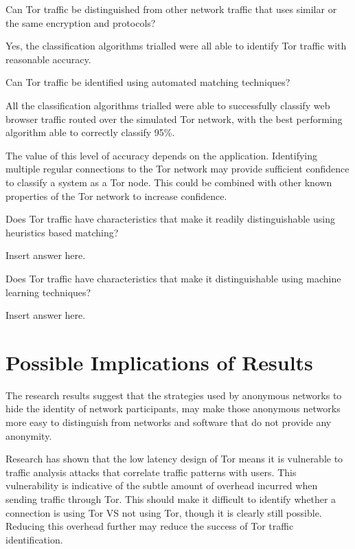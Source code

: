 \begin{enumerate*}
  \item{Can Tor traffic be distinguished from other network traffic that uses
    similar or the same encryption and protocols?}

  Yes, the classification algorithms trialled were all able to identify Tor traffic
  with reasonable accuracy.

  \item{Can Tor traffic be identified using automated matching techniques?}

  All the classification algorithms trialled were able to successfully classify
  web browser traffic routed over the simulated Tor network, with the best
  performing algorithm able to correctly classify 95\%.

  The value of this level of accuracy depends on the application. Identifying
  multiple regular connections to the Tor network may provide sufficient
  confidence to classify a system as a Tor node. This could be combined with
  other known properties of the Tor network to increase confidence.

  \item{Does Tor traffic have characteristics that make it readily distinguishable using
    heuristics based matching?}

  Insert answer here.

  \item{Does Tor traffic have characteristics that make it distinguishable using
    machine learning techniques?}

  Insert answer here.

\end{enumerate*}


\section{Possible Implications of Results}

The research results suggest that the strategies used by anonymous networks to
hide the identity of network participants, may make those anonymous networks
more easy to distinguish from networks and software that do not provide any
anonymity.

Research has shown that the low latency design of Tor means it is vulnerable to
traffic analysis attacks that correlate traffic patterns with users. This
vulnerability is indicative of the subtle amount of overhead incurred when
sending traffic through Tor. This should make it difficult to identify whether a
connection is using Tor VS not using Tor, though it is clearly still possible.
Reducing this overhead further may reduce the success of Tor traffic
identification.

